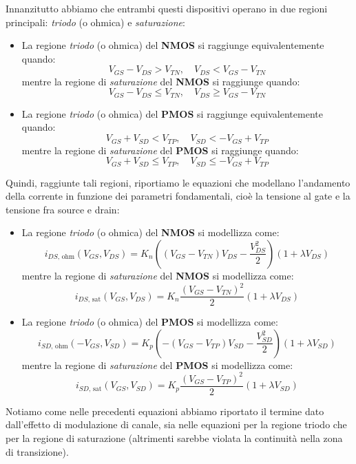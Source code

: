 \documentclass[a4paper,11pt]{article}
\begin{document}
Innanzitutto abbiamo che entrambi questi dispositivi operano in due regioni principali: \textit{triodo} (o ohmica) e \textit{saturazione}:
\begin{itemize}
\item La regione \textit{triodo} (o ohmica) del \textbf{NMOS} si raggiunge equivalentemente quando:
$$
V_{GS} - V_{DS} > V_{TN}, \quad V_{DS} < V_{GS} - V_{TN}
$$
mentre la regione di \textit{saturazione} del \textbf{NMOS} si raggiunge quando:
$$
V_{GS} - V_{DS} \leq V_{TN}, \quad V_{DS} \geq V_{GS} - V_{TN}
$$

\item La regione \textit{triodo} (o ohmica) del \textbf{PMOS} si raggiunge equivalentemente quando:
$$
V_{GS} + V_{SD} < V_{TP}, \quad V_{SD} < -V_{GS} + V_{TP}
$$
mentre la regione di \textit{saturazione} del \textbf{PMOS} si raggiunge quando:
$$
V_{GS} + V_{SD} \leq V_{TP}, \quad V_{SD} \leq -V_{GS} + V_{TP}
$$
\end{itemize}

Quindi, raggiunte tali regioni, riportiamo le equazioni che modellano l'andamento della corrente in funzione dei parametri fondamentali, cioè la tensione al gate e la tensione fra source e drain:
\begin{itemize}
\item La regione \textit{triodo} (o ohmica) del \textbf{NMOS} si modellizza come:
$$
i_{DS, \, \text{ohm}}\left(V_{GS},V_{DS}\right)=K_{n}\left(\left(V_{GS}-V_{TN}\right)V_{DS}-\frac{V_{DS}^{2}}{2}\right)\left(1+\lambda V_{DS}\right)
$$
mentre la regione di \textit{saturazione} del \textbf{NMOS} si modellizza come:
$$
i_{DS, \, \text{sat}}\left(V_{GS},V_{DS}\right)=K_{n}\frac{\left(V_{GS}-V_{TN}\right)^{2}}{2}\left(1+\lambda V_{DS}\right)
$$
	
\item La regione \textit{triodo} (o ohmica) del \textbf{PMOS} si modellizza come:
$$
i_{SD, \, \text{ohm}}\left(-V_{GS},V_{SD}\right)=K_{p}\left(-\left(V_{GS}-V_{TP}\right)V_{SD}-\frac{V_{SD}^{2}}{2}\right)\left(1+\lambda V_{SD}\right)
$$
mentre la regione di \textit{saturazione} del \textbf{PMOS} si modellizza come:
$$
i_{SD, \, \text{sat}}\left(V_{GS},V_{SD}\right)=K_{p}\frac{\left(V_{GS}-V_{TP}\right)^{2}}{2}\left(1+\lambda V_{SD}\right)
$$
\end{itemize}
Notiamo come nelle precedenti equazioni abbiamo riportato il termine dato dall'effetto di modulazione di canale, sia nelle equazioni per la regione triodo che per la regione di saturazione (altrimenti sarebbe violata la continuità nella zona di transizione).
\end{document}
